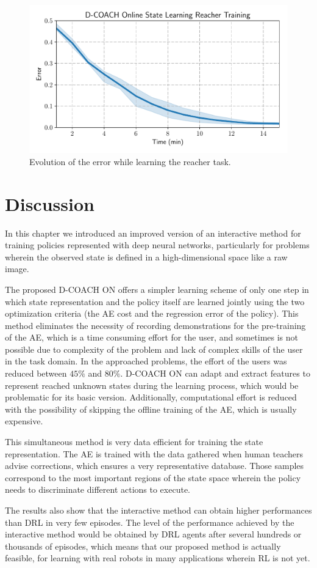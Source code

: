 \begin{figure}[H]
    \centering
    \includegraphics[width=0.9\linewidth]{imagenes/cap3/reacher_ICRA.pdf}
    \caption{Evolution of the error while learning the reacher task. }
    \label{fig:reacher_exp}
\end{figure}

\section{Discussion}

In this chapter we introduced an improved version of an interactive method for training policies represented with deep neural networks, particularly for problems wherein the observed state is defined in a high-dimensional space like a raw image.

The proposed D-COACH ON offers a simpler learning scheme of only one step in which state representation and the policy itself are learned jointly using the two optimization criteria (the AE cost and the regression error of the policy). This method eliminates the necessity of recording demonstrations for the pre-training of the AE, which is a time consuming effort for the user, and sometimes is not possible due to complexity of the problem and lack of complex skills of the user in the task domain. In the approached problems, the effort of the users was reduced between $45\%$ and $80\%$. D-COACH ON can adapt and extract features to represent reached unknown states during the learning process, which would be problematic for its basic version. Additionally, computational effort is reduced with the possibility of skipping the offline training of the AE, which is usually expensive. 

This simultaneous method is very data efficient for training the state representation. The AE is trained with the data gathered when human teachers advise corrections, which ensures a very representative database. Those samples correspond to the most important regions of the state space wherein the policy needs to discriminate different actions to execute.

The results also show that the interactive method can obtain higher performances than DRL in very few episodes. The level of the performance achieved by the interactive method would be obtained by DRL agents after several hundreds or thousands of episodes, which means that our proposed method is actually feasible, for learning with real robots in many applications wherein RL is not yet.